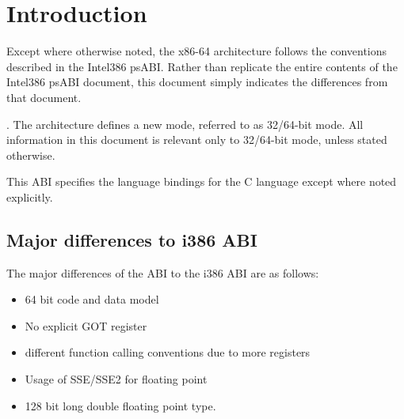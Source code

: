 
\chapter{Introduction}

Except where otherwise noted, the x86-64 architecture follows the
conventions described in the Intel386 psABI.  Rather than replicate
the entire contents of the Intel386 psABI document, this document
simply indicates the differences from that document.

.
The \xARCH architecture defines a new mode, referred to as 32/64-bit
mode. All information in this document is relevant only to 32/64-bit
mode, unless stated otherwise.

This ABI specifies the language bindings for the C language except
where noted explicitly.

\section{Major differences to i386 ABI}

The major differences of the \xARCH ABI to the i386 ABI are as
follows:
\begin{itemize}
\item 64 bit code and data model
\item No explicit GOT register
\item different function calling conventions due to more registers
\item Usage of SSE/SSE2 for floating point
\item 128 bit long double floating point type. 
\end{itemize}

